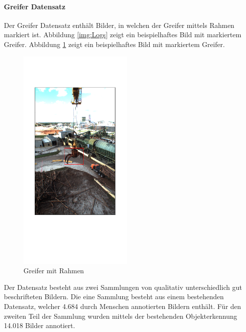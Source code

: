 		\paragraph{Greifer Datensatz} Der Greifer Datensatz enthält Bilder, in welchen der Greifer mittels Rahmen markiert ist. Abbildung \ref{img:Logs}  zeigt ein beispielhaftes Bild mit markiertem Greifer. Abbildung \ref{img:Grapple} zeigt ein beispielhaftes Bild mit markiertem Greifer.
		\begin{figure}[h]
				\centering
				\includegraphics[width=0.5\textwidth, center]{bilder/Grundlagen/Grapple_8.png}
				\caption[Bsp. Bild: Greifer mit Rahmen]{Greifer mit Rahmen}
				\label{img:Grapple}
		\end{figure}
		Der Datensatz besteht aus zwei Sammlungen von qualitativ unterschiedlich gut beschrifteten Bildern. Die eine Sammlung besteht aus einem bestehenden Datensatz, welcher 4.684 durch Menschen annotierten Bildern enthält. Für den zweiten Teil der Sammlung wurden mittels der bestehenden Objekterkennung 14.018 Bilder annotiert. 
		
